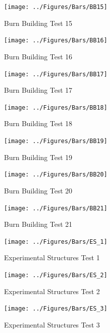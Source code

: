 \documentclass[12pt,oneside]{book}
\begin{document}
\begin{figure}[!ht]
	\texttt{[image: ../Figures/Bars/BB15]}
	\caption{Burn Building Test 15}
	\label{fig:Burn_Building_Test_15}
\end{figure}

\begin{figure}[!ht]
	\texttt{[image: ../Figures/Bars/BB16]}
	\caption{Burn Building Test 16}
	\label{fig:Burn_Building_Test_16}
\end{figure}

\clearpage

\begin{figure}[!ht]
	\texttt{[image: ../Figures/Bars/BB17]}
	\caption{Burn Building Test 17}
	\label{fig:Burn_Building_Test_17}
\end{figure}

\begin{figure}[!ht]
	\texttt{[image: ../Figures/Bars/BB18]}
	\caption{Burn Building Test 18}
	\label{fig:Burn_Building_Test_18}
\end{figure}

\begin{figure}[!ht]
	\texttt{[image: ../Figures/Bars/BB19]}
	\caption{Burn Building Test 19}
	\label{fig:Burn_Building_Test_19}
\end{figure}

\begin{figure}[!ht]
	\texttt{[image: ../Figures/Bars/BB20]}
	\caption{Burn Building Test 20}
	\label{fig:Burn_Building_Test_20}
\end{figure}

\begin{figure}[!ht]
	\texttt{[image: ../Figures/Bars/BB21]}
	\caption{Burn Building Test 21}
	\label{fig:Burn_Building_Test_21}
\end{figure}

\clearpage

\begin{figure}[!ht]
	\texttt{[image: ../Figures/Bars/ES\_1]}
	\caption{Experimental Structures Test 1}
	\label{fig:Experimental_Structures_Test_1}
\end{figure}

\begin{figure}[!ht]
	\texttt{[image: ../Figures/Bars/ES\_2]}
	\caption{Experimental Structures Test 2}
	\label{fig:Experimental_Structures_Test_2}
\end{figure}

\begin{figure}[!ht]
	\texttt{[image: ../Figures/Bars/ES\_3]}
	\caption{Experimental Structures Test 3}
	\label{fig:Experimental_Structures_Test_3}
\end{figure}
\end{document}
